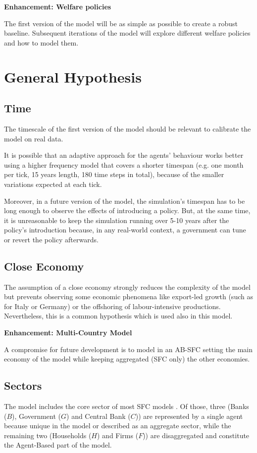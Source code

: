 \documentclass[a4paper, headings=standardclasses]{scrartcl}
\newenvironment{enh}[1][]{\begin{framed}\noindent\textbf{Enhancement: #1}\par}{\end{framed}}
\begin{document}
\begin{enh}[Welfare policies]
	The first version of the model will be as simple as possible to create a robust baseline.
	Subsequent iterations of the model will explore different welfare policies and how to model them.
\end{enh}

\section{General Hypothesis}
\subsection{Time}
The timescale of the first version of the model should be relevant to calibrate the model on real data.

It is possible that an adaptive approach for the agents' behaviour works better using a higher frequency model that covers a shorter timespan (e.g. one month per tick, 15 years length, 180 time steps in total), because of the smaller variations expected at each tick.

Moreover, in a future version of the model, the simulation's timespan has to be long enough to observe the effects of introducing a policy. But, at the same time, it is unreasonable to keep the simulation running over 5-10 years after the policy's introduction because, in any real-world context, a government can tune or revert the policy afterwards.

\subsection{Close Economy}
The assumption of a close economy strongly reduces the complexity of the model but prevents observing some economic phenomena like export-led growth (such as for Italy or Germany) or the offshoring of labour-intensive productions.
Nevertheless, this is a common hypothesis which is used also in this model.

\begin{enh}[Multi-Country Model]
	A compromise for future development is to model in an AB-SFC setting the main economy of the model while keeping aggregated (SFC only) the other economies.
\end{enh}

\subsection{Sectors}
The model includes the core sector of most SFC models \parencite{nikiforos2017}. Of those, three (Banks ($B$), Government ($G$) and Central Bank ($C$)) are represented by a single agent because unique in the model or described as an aggregate sector, while the remaining two (Households ($H$) and Firms ($F$)) are disaggregated and constitute the Agent-Based part of the model.
\end{document}
